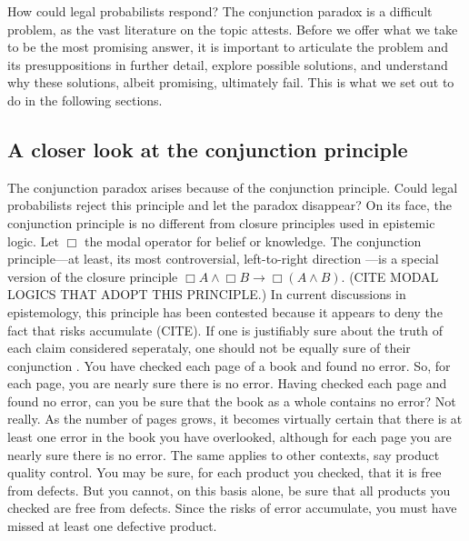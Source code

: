 \documentclass[10pt,dvipsnames,enabledeprecatedfontcommands]{scrartcl}
\newcommand{\et}{\wedge}
\begin{document}
How could legal probabilists respond? The conjunction paradox is a
difficult problem, as the vast literature on the topic attests. Before
we offer what we take to be the most promising answer, it is important
to articulate the problem
 and
its presuppositions in further detail, explore possible solutions, and
understand why these solutions, albeit promising, ultimately fail. This
is what we set out to do in the following sections.

\hypertarget{a-closer-look-at-the-conjunction-principle}{%
\subsection{A closer look at the conjunction
principle}\label{a-closer-look-at-the-conjunction-principle}}

The conjunction paradox arises because of the conjunction principle.
Could legal probabilists reject this principle and let the paradox
disappear? On its face, the conjunction principle is no different from
closure principles used in epistemic logic. Let \(\Box\) the modal
operator for belief or knowledge. The conjunction principle---at least,
its most controversial, left-to-right direction
---is a special version of the closure principle
\(\Box A \wedge \Box B \rightarrow \Box (A \et B)\). (CITE MODAL LOGICS
THAT ADOPT THIS PRINCIPLE.) 
In current discussions in epistemology, this principle has been
contested because it appears to deny the fact that risks accumulate
(CITE).
If one is justifiably sure about the truth of each claim considered
seperataly, one should not be equally sure of their conjunction
. You have
checked each page of a book and found no error. So, for each page, you
are nearly sure there is no error. Having checked each page and found no
error, can you be sure that the book as a whole contains no error? Not
really. As the number of pages grows, it becomes virtually certain that
there is at least one error in the book you have overlooked, although
for each page you are nearly sure there is no error. The same applies to
other contexts, say product quality control. You may be sure, for each
product you checked, that it is free from defects. But you cannot, on
this basis alone, be sure that all products you checked are free from
defects. Since the risks of error accumulate, you must have missed at
least one defective product.
\end{document}
